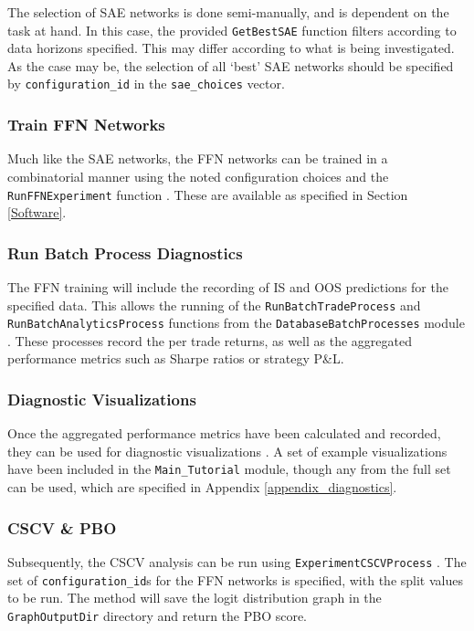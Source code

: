 \documentclass[a4paper,11pt,oneside]{article}
\theoremstyle{plain}
\theoremstyle{definition}
\begin{document}
	The selection of SAE networks is done semi-manually, and is dependent on the task at hand. In this case, the provided \texttt{GetBestSAE} function filters according to data horizons specified. This may differ according to what is  being investigated. As the case may be, the  selection of all `best' SAE networks should be specified by \texttt{configuration\_id} in the \texttt{sae\_choices} vector.
	
	\subsubsection{Train FFN Networks}
	
	Much like the SAE networks, the FFN networks can be trained in a combinatorial manner using the noted configuration choices and the \texttt{RunFFNExperiment} function \citep{DCExperimentProcessTrainFFN}. These are available as specified in Section \ref{Software}.
	
	\subsubsection{Run Batch Process Diagnostics}
	
	The FFN training will include the recording of IS and OOS predictions for the specified data. This allows the running of the \texttt{RunBatchTradeProcess} and \texttt{RunBatchAnalyticsProcess} functions from the \texttt{DatabaseBatchProcesses} module \citep{DCDatabaseBatchProcesses}. These processes record the per trade returns, as well as the aggregated performance metrics such as Sharpe ratios or strategy P\&L.
	
	\subsubsection{Diagnostic Visualizations}

	Once the aggregated performance metrics have been calculated and recorded, they can be used for diagnostic visualizations \citep{DCExperimentGraph}. A set of example visualizations have been included in the \texttt{Main\_Tutorial} module, though any from the full set can be used, which are specified in Appendix \ref{appendix_diagnostics}.

	\subsubsection{CSCV \& PBO}

	Subsequently, the CSCV analysis can be run using \texttt{ExperimentCSCVProcess} \citep{DCCSCV}. The set of \texttt{configuration\_id}s for the FFN networks is specified, with the split values to be run. The method will save the logit distribution graph in the \texttt{GraphOutputDir} directory and return the PBO score.
	
\end{document}
